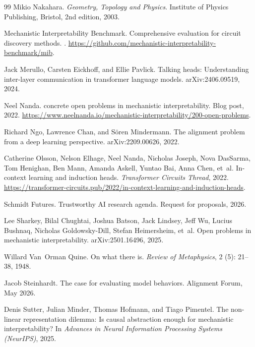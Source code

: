 \documentclass[11pt]{article}
\theoremstyle{remark}
\begin{document}
\begin{thebibliography}{99}
Mikio Nakahara.
\newblock \emph{Geometry, Topology and Physics}.
\newblock Institute of Physics Publishing, Bristol, 2nd edition, 2003.

Mechanistic Interpretability Benchmark.
\newblock Comprehensive evaluation for circuit discovery methods.
.
\newblock \url{https://github.com/mechanistic-interpretability-benchmark/mib}.

Jack Merullo, Carsten Eickhoff, and Ellie Pavlick.
\newblock Talking heads: Understanding inter-layer communication in transformer
  language models.
\newblock arXiv:2406.09519, 2024.

Neel Nanda.
 concrete open problems in mechanistic interpretability.
\newblock Blog post, 2022.
\newblock \url{https://www.neelnanda.io/mechanistic-interpretability/200-open-problems}.

Richard Ngo, Lawrence Chan, and S\"oren Mindermann.
\newblock The alignment problem from a deep learning perspective.
\newblock arXiv:2209.00626, 2022.

Catherine Olsson, Nelson Elhage, Neel Nanda, Nicholas Joseph, Nova DasSarma,
  Tom Henighan, Ben Mann, Amanda Askell, Yuntao Bai, Anna Chen, et~al.
\newblock In-context learning and induction heads.
\newblock \emph{Transformer Circuits Thread}, 2022.
\newblock \url{https://transformer-circuits.pub/2022/in-context-learning-and-induction-heads}.

Schmidt Futures.
\newblock Trustworthy AI research agenda.
\newblock Request for proposals, 2026.

Lee Sharkey, Bilal Chughtai, Joshua Batson, Jack Lindsey, Jeff Wu, Lucius
  Bushnaq, Nicholas Goldowsky-Dill, Stefan Heimersheim, et~al.
\newblock Open problems in mechanistic interpretability.
\newblock arXiv:2501.16496, 2025.

Willard Van~Orman Quine.
\newblock On what there is.
\newblock \emph{Review of Metaphysics}, 2 (5): 21--38, 1948.

Jacob Steinhardt.
\newblock The case for evaluating model behaviors.
\newblock Alignment Forum, May 2026.

Denis Sutter, Julian Minder, Thomas Hofmann, and Tiago Pimentel.
\newblock The non-linear representation dilemma: Is causal abstraction enough
  for mechanistic interpretability?
\newblock In \emph{Advances in Neural Information Processing Systems
  (NeurIPS)}, 2025.


\end{thebibliography}
\end{document}
